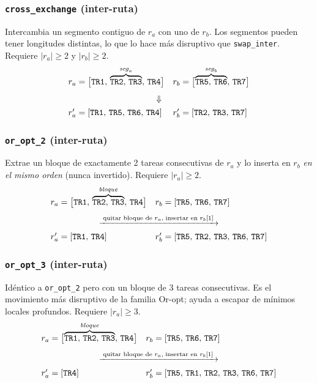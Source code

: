 \subsubsection{\texttt{cross\_exchange} (inter-ruta)}
Intercambia un segmento contiguo de $r_a$ con uno de $r_b$. Los segmentos
pueden tener longitudes distintas, lo que lo hace más disruptivo que
\texttt{swap\_inter}. Requiere $|r_a| \geq 2$ y $|r_b| \geq 2$.
\[
    \begin{array}{ll}
        r_a = \bigl[\mathtt{TR1},\,
                    \overbrace{\mathtt{TR2},\,\mathtt{TR3}}^{\mathit{seg}_a},\,
                    \mathtt{TR4}\bigr]
        &
        r_b = \bigl[\overbrace{\mathtt{TR5},\,\mathtt{TR6}}^{\mathit{seg}_b},\,
                    \mathtt{TR7}\bigr] \\[8pt]
        \multicolumn{2}{c}{\Downarrow} \\[4pt]
        r'_a = [\mathtt{TR1},\,\mathtt{TR5},\,\mathtt{TR6},\,\mathtt{TR4}]
        &
        r'_b = [\mathtt{TR2},\,\mathtt{TR3},\,\mathtt{TR7}]
    \end{array}
\]

\subsubsection{\texttt{or\_opt\_2} (inter-ruta)}
Extrae un bloque de exactamente 2 tareas consecutivas de $r_a$ y lo inserta
en $r_b$ \emph{en el mismo orden} (nunca invertido). Requiere $|r_a| \geq 2$.
\[
    \begin{array}{ll}
        r_a = \bigl[\mathtt{TR1},\,
                    \overbrace{\mathtt{TR2},\,\mathtt{TR3}}^{\mathit{bloque}},\,
                    \mathtt{TR4}\bigr]
        &
        r_b = [\mathtt{TR5},\,\mathtt{TR6},\,\mathtt{TR7}] \\[8pt]
        \multicolumn{2}{c}{\xrightarrow{\;\text{quitar bloque de }r_a,\;\text{insertar en }r_b[1]\;}} \\[4pt]
        r'_a = [\mathtt{TR1},\,\mathtt{TR4}]
        &
        r'_b = [\mathtt{TR5},\,\mathtt{TR2},\,\mathtt{TR3},\,\mathtt{TR6},\,\mathtt{TR7}]
    \end{array}
\]

\subsubsection{\texttt{or\_opt\_3} (inter-ruta)}
Idéntico a \texttt{or\_opt\_2} pero con un bloque de 3 tareas consecutivas.
Es el movimiento más disruptivo de la familia Or-opt; ayuda a escapar de
mínimos locales profundos. Requiere $|r_a| \geq 3$.
\[
    \begin{array}{ll}
        r_a = \bigl[\overbrace{\mathtt{TR1},\,\mathtt{TR2},\,\mathtt{TR3}}^{\mathit{bloque}},\,
                    \mathtt{TR4}\bigr]
        &
        r_b = [\mathtt{TR5},\,\mathtt{TR6},\,\mathtt{TR7}] \\[8pt]
        \multicolumn{2}{c}{\xrightarrow{\;\text{quitar bloque de }r_a,\;\text{insertar en }r_b[1]\;}} \\[4pt]
        r'_a = [\mathtt{TR4}]
        &
        r'_b = [\mathtt{TR5},\,\mathtt{TR1},\,\mathtt{TR2},\,\mathtt{TR3},\,\mathtt{TR6},\,\mathtt{TR7}]
    \end{array}
\]

